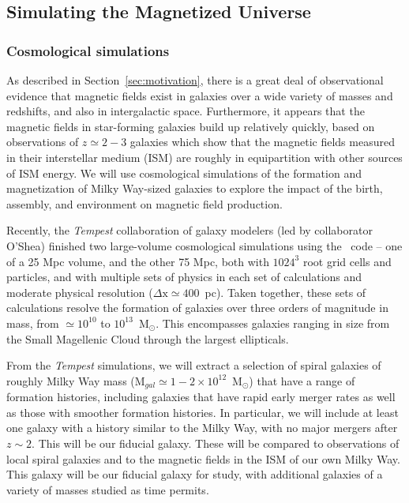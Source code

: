\subsection{Simulating the Magnetized Universe}
\label{sec:simulations}
\vspace{-1mm}

\subsubsection{Cosmological simulations}
\label{sec:cosmo_sims}
\vspace{-2mm}

As described in Section~\ref{sec:motivation}, there is a great deal of
observational evidence that magnetic fields exist in galaxies over a
wide variety of masses and redshifts, and also in intergalactic space.
Furthermore, it appears that the magnetic fields in star-forming
galaxies build up relatively quickly, based on observations of $z
\simeq 2-3$ galaxies which show that the magnetic fields measured in
their interstellar medium (ISM) are roughly in equipartition with
other sources of ISM energy.  
We will use cosmological simulations of the formation and magnetization of Milky Way-sized galaxies to explore 
the impact of the birth, assembly, and environment on magnetic field production.

Recently, the \emph{Tempest} collaboration of galaxy modelers
(led by collaborator O'Shea) finished two 
large-volume cosmological simulations using the \enzo\ code -- one of
a 25 Mpc volume, and the other 75 Mpc, both with $1024^3$ root grid
cells and particles, and with multiple sets of physics in each set of
calculations and moderate physical resolution ($\Delta \mathrm{x} \simeq 400$~pc).  Taken together, these sets of calculations resolve the
formation of galaxies over three orders of magnitude in mass, from
$\simeq 10^{10}$ to $10^{13}$~M$_\odot$. This encompasses galaxies
ranging in size from the Small Magellenic Cloud through the largest
ellipticals.  

From the \emph{Tempest} simulations, we will extract a selection of 
 spiral galaxies of roughly Milky Way mass (M$_{gal} \simeq 1-2 \times
10^{12}$~M$_\odot$) that have a range of formation histories,
including galaxies that have rapid early merger rates as well as those
with smoother formation histories.  In particular, we will include at least one galaxy
with a history similar to the Milky Way, with no major
mergers after $z \sim 2$.  This will be our fiducial galaxy.
These will be compared to observations of
local spiral galaxies \cite[e.g.,][]{2014arXiv1411.1386V} and to the
magnetic fields in the ISM of our own Milky Way.  This galaxy will be our
fiducial galaxy for study, with additional galaxies of a variety of masses
studied as time permits.


